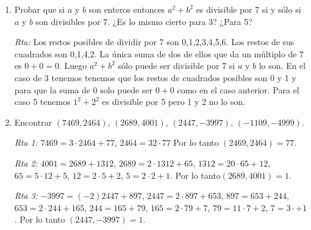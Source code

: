 \documentclass[12pt,spanish,makeidx]{amsbook}
\newcommand{\rta}{\noindent\textit{Rta: }}
\begin{document}
\begin{enumerate}
\begin{enumerate}
	\item Probar que el producto de cuatro enteros consecutivos es divisible por 24.
	
	\rta Como en el ejercicio anterior, ahora tenemos que uno de los números es divisible por 4 y otro de los restantes es divisible por 2. Entonces el producto es divisible por 8 y también hay uno que es múltiplo de 3 por lo cual el producto es divisible por $24=3\times8$.
	
	\textit{Rta Alternativa:} el producto de cuatro enteros consecutivos es de la forma $n(n-1)(n-2)(n-3)$. Ahora bien,
	\begin{equation*}
		\binom{n}{4} = \frac{n!}{(n-4)!4!} = \frac{n(n-1)(n-2)(n-3)}{4!}.
	\end{equation*}
	Por un teorema de la teórica sabemos que $\displaystyle\binom{n}{4}$ es un número entero, por lo tanto $ \displaystyle\frac{n(n-1)(n-2)(n-3)}{4!}$ es entero, lo cual quiere decir que $$4! | n(n-1)(n-2)(n-3)$$ (y $4! = 24$). 
	
\end{enumerate}



\smallskip
\item Probar que si $a$ y $b$ son enteros entonces $a^2+b^2$ es divisible por 7 si y s\'olo si $a$ y $b$ son divisibles por 7. ¿Es lo mismo cierto para 3? ¿Para 5?

\rta Los restos posibles de dividir por 7 son 0,1,2,3,4,5,6. Los restos de sus cuadrados son 0,1,4,2. La única suma de dos de ellos que da un múltiplo de 7 es $0+0=0$. Luego $a^2+b^2$ sólo puede ser divisible por 7 si $a$ y $b$ lo son.
En el caso de 3 tenemos tenemos que los restos de cuadrados posibles son 0 y 1 y para que la suma de 0 solo puede ser $0+0$ como en el caso anterior. Para el caso 5 tenemos $1^2+2^2$ es divisible por 5 pero 1 y 2 no lo son.

\smallskip


\item Encontrar $(7469,2464)$, $(2689,4001)$, $(2447,-3997)$, $(-1109,-4999)$.

\noindent\textit{Rta 1: }  $7469=3\cdot 2464+ 77$, $2464= 32\cdot77$ Por lo tanto $(2469,2464)=77$.

\noindent\textit{Rta 2: }  $4001=2689+ 1312$, $2689=2\cdot 1312+65$,  $1312=20\cdot 65+12$,  $65=5\cdot 12+5$,  $12=2\cdot 5+2$, $ 5=2\cdot 2+1$. Por lo tanto$ (2689, 4001)=1$.

\noindent\textit{Rta 3: } $-3997=(-2)2447+897$,  $2447=2\cdot 897+653$,  $897=653+244$,  $653=2\cdot244+165$, $244=165+79$,  $165=2\cdot79+7$, $79=11\cdot7+2$, $7=3\cdot+1$. Por lo tanto $(2447,-3997)=1$.


\end{enumerate}
\end{document}
